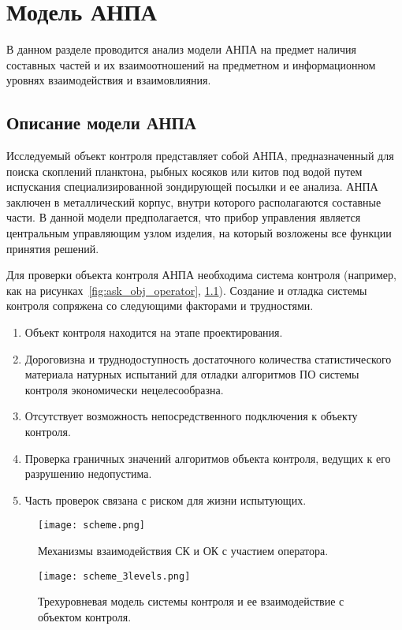 \chapter{Модель АНПА}\label{sec:part2}
В данном разделе проводится анализ модели АНПА на предмет наличия составных частей
и их взаимоотношений на предметном и информационном уровнях взаимодействия и взаимовлияния.

\section{Описание модели АНПА} \label{sec:model_anpa}

Исследуемый объект контроля представляет собой АНПА, предназначенный для поиска скоплений планктона,
рыбных косяков или китов под водой путем испускания специализированной зондирующей посылки и ее анализа.
АНПА заключен в металлический корпус, внутри которого располагаются составные части.
В данной модели предполагается, что прибор управления является центральным управляющим узлом изделия,
на который возложены все функции принятия решений.

Для проверки объекта контроля АНПА необходима система контроля (например, как на рисунках~\ref{fig:ask_obj_operator}, \ref{fig:ask_obj_operator_3}).
Создание и отладка системы контроля сопряжена со следующими факторами и трудностями.
\begin{enumerate}
    \item Объект контроля находится на этапе проектирования.
    \item Дороговизна и труднодоступность достаточного количества статистического материала
    натурных испытаний для отладки алгоритмов ПО системы контроля экономически нецелесообразна.
    \item Отсутствует возможность непосредственного подключения к объекту контроля.
    \item Проверка граничных значений алгоритмов объекта контроля, ведущих к его разрушению недопустима.
    \item Часть проверок связана с риском для жизни испытующих.
\end{enumerate}

\begin{figure}[hb!]
    \begin{center}
        \texttt{[image: scheme.png]}
        \caption[Взаимодействие СК и ОК]
            {Механизмы взаимодействия СК и ОК с участием оператора.}
                \label{fig:ask_obj_operator}
        \texttt{[image: scheme\_3levels.png]}
        \caption[Взаимодействие СК и ОК]
            {Трехуровневая модель системы контроля и ее взаимодействие с объектом контроля.}
                \label{fig:ask_obj_operator_3}
    \end{center}
\end{figure}

